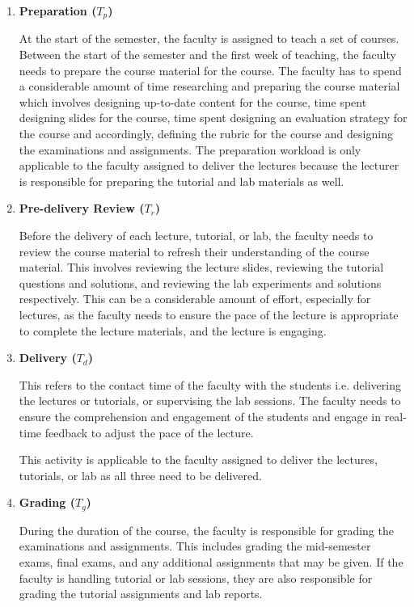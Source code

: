 \begin{enumerate}
  \item \textbf{Preparation (\(T_p\))}

        At the start of the semester, the faculty is assigned to teach a set of courses. Between the start of the semester and the first week of teaching, the faculty needs to prepare the course material for the course. The faculty has to spend a considerable amount of time researching and preparing the course material which involves designing up-to-date content for the course, time spent designing slides for the course, time spent designing an evaluation strategy for the course and accordingly, defining the rubric for the course and designing the examinations and assignments. The preparation workload is only applicable to the faculty assigned to deliver the lectures because the lecturer is responsible for preparing the tutorial and lab materials as well.

  \item \textbf{Pre-delivery Review (\(T_r\))}

        Before the delivery of each lecture, tutorial, or lab, the faculty needs to review the course material to refresh their understanding of the course material. This involves reviewing the lecture slides, reviewing the tutorial questions and solutions, and reviewing the lab experiments and solutions respectively. This can be a considerable amount of effort, especially for lectures, as the faculty needs to ensure the pace of the lecture is appropriate to complete the lecture materials, and the lecture is engaging.

  \item \textbf{Delivery (\(T_d\))}

        This refers to the contact time of the faculty with the students i.e. delivering the lectures or tutorials, or supervising the lab sessions. The faculty needs to ensure the comprehension and engagement of the students and engage in real-time feedback to adjust the pace of the lecture.

        This activity is applicable to the faculty assigned to deliver the lectures, tutorials, or lab as all three need to be delivered.

  \item \textbf{Grading (\(T_g\))}

        During the duration of the course, the faculty is responsible for grading the examinations and assignments. This includes grading the mid-semester exams, final exams, and any additional assignments that may be given. If the faculty is handling tutorial or lab sessions, they are also responsible for grading the tutorial assignments and lab reports.


\end{enumerate}
